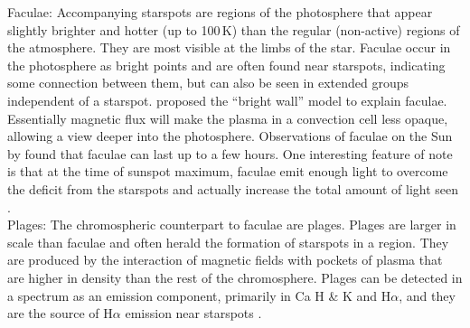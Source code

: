 Faculae: Accompanying starspots are regions of the photosphere that appear slightly brighter and hotter (up to 100\,K) than the regular (non-active) regions of the atmosphere. They are most visible at the limbs of the star. Faculae occur in the photosphere as bright points and are often found near starspots, indicating some connection between them, but can also be seen in extended groups independent of a starspot. \citet{1976Spruit} proposed the ``bright wall'' model to explain faculae. Essentially magnetic flux will make the plasma in a convection cell less opaque, allowing a view deeper into the photosphere. Observations of faculae on the Sun by \citet{1978Hiryama} found that faculae can last up to a few hours. One interesting feature of note is that at the time of sunspot maximum, faculae emit enough light to overcome the deficit from the starspots and actually increase the total amount of light seen \citep{2004Keller}.\\

Plages: The chromospheric counterpart to faculae are plages. Plages are larger in scale than faculae and often herald the formation of starspots in a region. They are produced by the interaction of magnetic fields with pockets of plasma that are higher in density than the rest of the chromosphere. Plages can be detected in a spectrum as an emission component, primarily in Ca H \& K and H$\alpha$, and they are the source of H$\alpha$ emission near starspots \citep{2006Carroll}.\\

